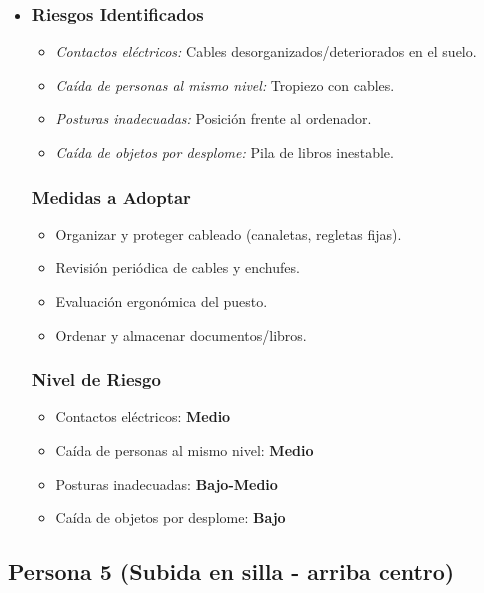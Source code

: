 \documentclass[12pt,a4paper]{article}
\begin{document}
	\begin{itemize}
		\item \subsubsection{Riesgos Identificados}
		\begin{itemize}
			\item \textit{Contactos eléctricos:} Cables desorganizados/deteriorados en el suelo.
			\item \textit{Caída de personas al mismo nivel:} Tropiezo con cables.
			\item \textit{Posturas inadecuadas:} Posición frente al ordenador.
			\item \textit{Caída de objetos por desplome:} Pila de libros inestable.
		\end{itemize}
		\subsubsection{Medidas a Adoptar}
		\begin{itemize}
			\item Organizar y proteger cableado (canaletas, regletas fijas).
			\item Revisión periódica de cables y enchufes.
			\item Evaluación ergonómica del puesto.
			\item Ordenar y almacenar documentos/libros.
		\end{itemize}
		\subsubsection{Nivel de Riesgo}
		\begin{itemize}
			\item Contactos eléctricos: \textbf{Medio}
			\item Caída de personas al mismo nivel: \textbf{Medio}
			\item Posturas inadecuadas: \textbf{Bajo-Medio}
			\item Caída de objetos por desplome: \textbf{Bajo}
		\end{itemize}
	\end{itemize}
	
	\hrulefill
	
	\subsection{Persona 5 (Subida en silla - arriba centro)}
	\label{subsec:persona5} %
	
\end{document}
